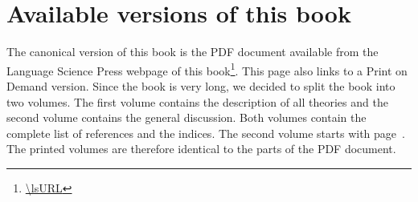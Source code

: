 
\section*{Available versions of this book}

The canonical version of this book is the PDF document available from the Language Science Press
webpage of this book\footnote{%
\url{\lsURL}
}. This page also links to a Print on Demand version. Since the book is very long, we decided to
split the book into two volumes. The first volume contains the description of all theories and the
second volume contains the general discussion. Both volumes contain the complete list of references
and the indices. The second volume starts with page~\pageref{part-discussion}. The printed volumes
are therefore identical to the parts of the PDF document.







